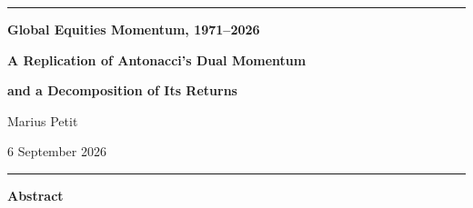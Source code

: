 \documentclass[11pt,a4paper]{article}
\begin{document}
\thispagestyle{empty}

\noindent\rule{\textwidth}{0.9pt}

\vspace{1.6em}
\begin{center}
  {\LARGE\bfseries Global Equities Momentum, 1971--2026\par}
  \vspace{0.45em}
  {\Large\bfseries A Replication of Antonacci's Dual Momentum\par}
  \vspace{0.2em}
  {\Large\bfseries and a Decomposition of Its Returns\par}

  \vspace{2.2em}
  {\Large Marius Petit\footnotemark[1]\par}

  \vspace{1.6em}
  {\normalsize 6 September 2026\par}
\end{center}
\vspace{1.4em}

\noindent\rule{\textwidth}{0.9pt}

\vspace{1.8em}
\begin{center}\textbf{Abstract}\end{center}
\vspace{0.4em}
\end{document}
